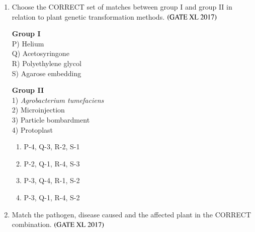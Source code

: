 \documentclass[journal]{IEEEtran}
\begin{document}
\begin{enumerate}
\begin{multicols}{2}
\columnbreak

\raggedright
\textbf{Group II} \\
1) Trophic level \\
2) Habitat \\
3) Ecosystem \\
4) Niche \\
5) Ecological pyramid 
\end{multicols}


\begin{enumerate}
    \item P-2, Q-5, R-4, S-1
    \item P-2, Q-4, R-1, S-3
    \item P-5, Q-2, R-3, S-1
    \item P-1, Q-3, R-4, S-2
\end{enumerate}

\item Choose the CORRECT set of matches between group I and group II in relation to plant genetic transformation methods. \hfill $\left(\text{GATE XL 2017}\right)$

\begin{multicols}{2}
\noindent \textbf{Group I} \\
P) Helium \\
Q) Acetosyringone \\
R) Polyethylene glycol \\
S) Agarose embedding \\

\columnbreak

\noindent \textbf{Group II} \\
1) \textit{Agrobacterium tumefaciens} \\
2) Microinjection \\
3) Particle bombardment \\
4) Protoplast \\
\end{multicols}


\begin{enumerate}
    \item P-4, Q-3, R-2, S-1
    \item P-2, Q-1, R-4, S-3
    \item P-3, Q-4, R-1, S-2
    \item P-3, Q-1, R-4, S-2
\end{enumerate}

\item Match the pathogen, disease caused and the affected plant in the CORRECT combination. \hfill $\left(\text{GATE XL 2017}\right)$


\end{enumerate}
\end{document}
